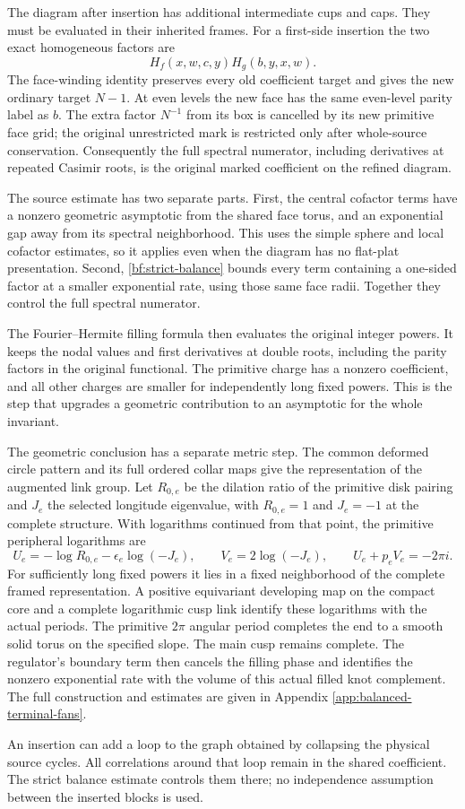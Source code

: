 The diagram after insertion has additional intermediate cups and caps.
They must be evaluated in their inherited frames. For a first-side
insertion the two exact homogeneous factors are
\begin{equation}\label{bf:local-source}
             H_f(x,w,c,y)H_g(b,y,x,w).
\end{equation}
The face-winding identity preserves every old coefficient target and
gives the new ordinary target $N-1$. At even levels the new face has
the same even-level parity label as $b$. The extra factor $N^{-1}$ from its
box is cancelled by its new primitive face grid; the original
unrestricted mark is restricted only after whole-source conservation.
Consequently the full spectral numerator, including derivatives at repeated Casimir roots,
is the original marked coefficient on the refined diagram.

The source estimate has two separate parts. First, the central cofactor
terms have a nonzero geometric asymptotic from the shared face torus,
and an exponential gap away from its spectral neighborhood. This uses
the simple sphere and local cofactor estimates, so it applies even when
the diagram has no flat-plat presentation. Second,
\eqref{bf:strict-balance} bounds every term containing a one-sided
factor at a smaller exponential rate, using those same face radii.
Together they control the full spectral numerator.

The Fourier--Hermite filling formula then evaluates the original
integer powers. It keeps the nodal values and first derivatives at double roots,
including the parity factors in the original functional. The primitive charge has a nonzero
coefficient, and all other charges are smaller for independently long
fixed powers. This is the step that upgrades a geometric contribution
to an asymptotic for the whole invariant.

The geometric conclusion has a separate metric step. The common
deformed circle pattern and its full ordered collar maps give the
representation of the augmented link group. Let $R_{0,e}$ be the
dilation ratio of the primitive disk pairing and $J_e$ the selected
longitude eigenvalue, with $R_{0,e}=1$ and $J_e=-1$ at the complete
structure. With logarithms continued from that point, the primitive
peripheral logarithms are
\[
 U_e=-\log R_{0,e}-\epsilon_e\log(-J_e),\qquad
 V_e=2\log(-J_e),\qquad U_e+p_eV_e=-2\pi i.
\]
For sufficiently long fixed powers it lies in a fixed neighborhood of
the complete framed representation. A positive equivariant developing
map on the compact core and a complete logarithmic cusp link identify
these logarithms with the actual periods. The primitive $2\pi$ angular
period completes the end to a smooth solid torus on the specified
slope. The main cusp remains complete. The regulator's boundary term
then cancels the filling phase and identifies the nonzero exponential
rate with the volume of this actual filled knot complement. The full
construction and estimates are given in Appendix
\ref{app:balanced-terminal-fans}.

An insertion can add a loop to the graph obtained by collapsing the
physical source cycles. All correlations around that loop remain in
the shared coefficient. The strict balance estimate controls them
there; no independence assumption between the inserted blocks is used.
